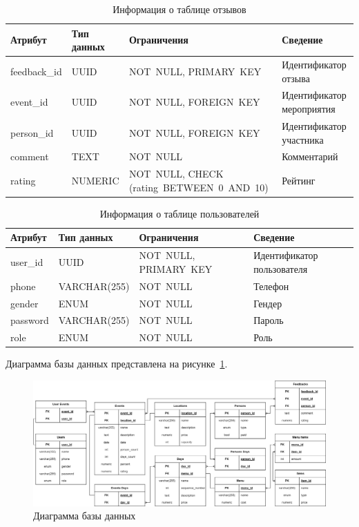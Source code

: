 \begin{table}[h!]
	\centering
	\caption{Информация о таблице отзывов}
	\begin{tabularx}{\textwidth}{|p{2.6cm}|X|p{6cm}|X|}
		\hline
		\textbf{Атрибут} & \textbf{Тип данных} & \textbf{Ограничения} & \textbf{Сведение} \\
		\hline
		feedback\_id & UUID & NOT~NULL, \newline PRIMARY~KEY & Идентификатор отзыва \\
		\hline
		event\_id & UUID & NOT~NULL, \newline FOREIGN~KEY & Идентификатор мероприятия \\
		\hline
		person\_id & UUID & NOT~NULL, \newline FOREIGN~KEY & Идентификатор участника \\
		\hline
		comment & TEXT & NOT~NULL & Комментарий \\
		\hline
		rating & NUMERIC & NOT~NULL, \newline CHECK (rating~BETWEEN~0~AND~10) & Рейтинг \\
		\hline
	\end{tabularx}
	\label{tbl:feedbacks}
\end{table}

\begin{table}[h!]
	\centering
	\caption{Информация о таблице пользователей}
	\begin{tabularx}{\textwidth}{|p{2.6cm}|X|p{6cm}|X|}
		\hline
		\textbf{Атрибут} & \textbf{Тип данных} & \textbf{Ограничения} & \textbf{Сведение} \\
		\hline
		user\_id & UUID & NOT~NULL, \newline PRIMARY~KEY & Идентификатор пользователя \\
		\hline
		phone & VARCHAR(255) & NOT~NULL & Телефон \\
		\hline
		gender & ENUM & NOT~NULL & Гендер \\
		\hline
		password & VARCHAR(255) & NOT~NULL & Пароль \\
		\hline
		role & ENUM & NOT~NULL & Роль \\
		\hline
	\end{tabularx}
	\label{tbl:users}
\end{table}

\newpage

Диаграмма базы данных представлена на рисунке~\ref{fig:db-diagram}.

\begin{figure}[h!]
	\centering
	\includegraphics[width=1\textwidth]{images/db-diagram.png}
	\caption{Диаграмма базы данных} 
	\label{fig:db-diagram} 
\end{figure}

